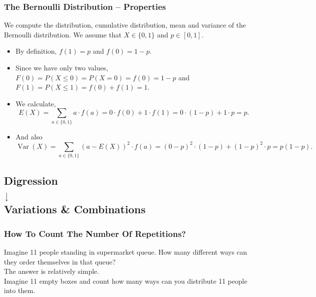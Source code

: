 \documentclass[aspectratio=169,11pt,usenames,dvipsnames]{beamer}
\DeclareMathOperator{\var}{Var}
\begin{document}
\begin{frame}
 \frametitle{The Bernoulli Distribution -- Properties}
 We compute the distribution, cumulative distribution, mean and variance of the
 Bernoulli distribution. We assume that $X \in \{0,1\}$ and $p \in [0,1]$.\\
 \pause
 \begin{itemize}
  \item By definition, $f(1) = p$ and $f(0) = 1 - p$. \pause
  \item Since we have only two values, $F(0) = P(X \leq 0) = P(X = 0) = f(0) = 1
   - p$ and $F(1) = P(X \leq 1) = f(0) + f(1) = 1$. \pause
  \item We calculate,
  \[
   E(X) = \sum_{a \in \{0,1\}} a \cdot f(a) = 0 \cdot f(0) + 1 \cdot f(1) = 0
   \cdot (1-p) + 1 \cdot p = p.
  \]
  \pause
 \item And also
 \[
  \var(X) = \sum_{a \in \{0,1\}} (a - E(X))^2 \cdot f(a) = (0 - p)^2 \cdot (1-p)
  + (1 - p)^2 \cdot p = p(1-p).
 \]
 \end{itemize}
\end{frame}

\subsection{Digression\\ $\big\downarrow$ \\ Variations \& Combinations}

\begin{frame}
 \subsectionpage
\end{frame}

\begin{frame}
 \frametitle{How To Count The Number Of Repetitions?}
 Imagine 11 people standing in supermarket queue. How many different ways can
 they order themselves in that queue?\\ \pause
 The answer is relatively simple.\\ \pause
 Imagine 11 empty boxes and count how many ways can you distribute 11 people
 into them.
 \begin{center}
 \end{center}
\end{frame}
\end{document}
